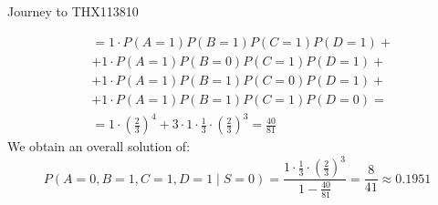 \begin{questions}
\begin{question}{Journey to THX1138}{10}
\begin{answer}
\begin{equation*}
\begin{split}
&  = 1\cdot P(A=1)P(B=1)P(C=1)P(D=1) + \\
& + 1\cdot P(A=1)P(B=0)P(C=1)P(D=1) + \\
& + 1\cdot P(A=1)P(B=1)P(C=0)P(D=1)+ \\
& + 1\cdot P(A=1)P(B=1)P(C=1)P(D=0) = \\
& = 1\cdot(\frac{2}{3})^{4} + 3\cdot1\cdot\frac{1}{3}\cdot(\frac{2}{3})^{3} = \frac{40}{81}
\end{split}
\end{equation*}
We obtain an overall solution of:
\begin{equation*}
P(A=0,B=1,C=1,D=1\mid S=0)  = \frac{1\cdot \frac{1}{3}\cdot (\frac{2}{3})^{3}}{1-\frac{40}{81}} = \frac{8}{41} \approx 0.1951
\end{equation*}
\end{answer}
\end{question}


\end{questions}
